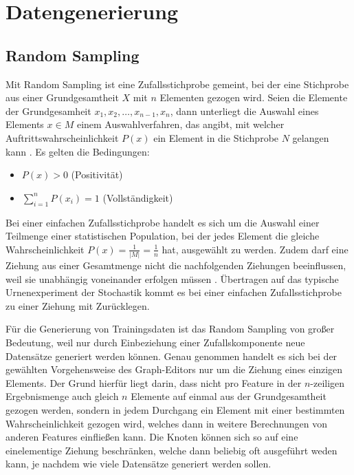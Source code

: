 
\chapter{Datengenerierung}

\section{Random Sampling}

Mit Random Sampling ist eine Zufallsstichprobe gemeint, bei der eine Stichprobe aus einer Grundgesamtheit $X$ mit $n$ Elementen gezogen wird. Seien die Elemente der Grundgesamheit $x_1,x_2,\dots,x_{n-1},x_n$, dann unterliegt die Auswahl eines Elements $x \in M$ einem Auswahlverfahren, das angibt, mit welcher Auftrittswahrscheinlichkeit $P(x)$ ein Element in die Stichprobe $N$ gelangen kann \cite{RandomSampling}.
Es gelten die Bedingungen:
\begin{itemize}
    \item $P(x) > 0$ (Positivität)
    \item $\sum_{i=1}^{n}P(x_i)=1$ (Vollständigkeit)
\end{itemize}

Bei einer einfachen Zufallsstichprobe handelt es sich um die Auswahl einer Teilmenge einer statistischen Population, bei der jedes Element die gleiche Wahrscheinlichkeit $P(x)=\frac{1}{\lvert M \rvert}=\frac{1}{n}$ hat, ausgewählt zu werden. Zudem darf eine Ziehung aus einer Gesamtmenge nicht die nachfolgenden Ziehungen beeinflussen, weil sie unabhängig voneinander erfolgen müssen \cite{RandomSampling}. Übertragen auf das typische Urnenexperiment der Stochastik kommt es bei einer einfachen Zufallsstichprobe zu einer Ziehung mit Zurücklegen.

Für die Generierung von Trainingsdaten ist das Random Sampling von großer Bedeutung, weil nur durch Einbeziehung einer Zufallskomponente neue Datensätze generiert werden können. Genau genommen handelt es sich bei der gewählten Vorgehensweise des Graph-Editors nur um die Ziehung eines einzigen Elements. Der Grund hierfür liegt darin, dass nicht pro Feature in der $n$-zeiligen Ergebnismenge auch gleich $n$ Elemente auf einmal aus der Grundgesamtheit gezogen werden, sondern in jedem Durchgang ein Element mit einer bestimmten Wahrscheinlichkeit gezogen wird, welches dann in weitere Berechnungen von anderen Features einfließen kann. Die Knoten können sich so auf eine einelementige Ziehung beschränken, welche dann beliebig oft ausgeführt weden kann, je nachdem wie viele Datensätze generiert werden sollen.

